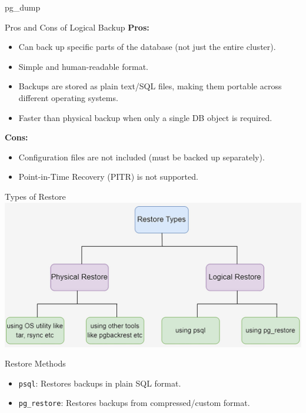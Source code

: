 \documentclass[aspectratio=169]{beamer}
\begin{document}
\begin{frame}{pg\_dump}
\end{frame}

\begin{frame}{Pros and Cons of Logical Backup}
    \textbf{Pros:}
    \begin{itemize}
        \item Can back up specific parts of the database (not just the entire cluster).
        \item Simple and human-readable format.
        \item Backups are stored as plain text/SQL files, making them portable across different operating systems.
        \item Faster than physical backup when only a single DB object is required.
    \end{itemize}

    \vspace{0.3cm}
    \textbf{Cons:}
    \begin{itemize}
        \item Configuration files are not included (must be backed up separately).
        \item Point-in-Time Recovery (PITR) is not supported.
    \end{itemize}
\end{frame}

\begin{frame}{Types of Restore}
    \centering
    \includegraphics[width=\textwidth]{figures/restore_types}
\end{frame}

\begin{frame}{Restore Methods}
    \begin{itemize}
        \item \texttt{psql}: Restores backups in plain SQL format.
        \item \texttt{pg\_restore}: Restores backups from compressed/custom format.
    \end{itemize}
\end{frame}
\end{document}
